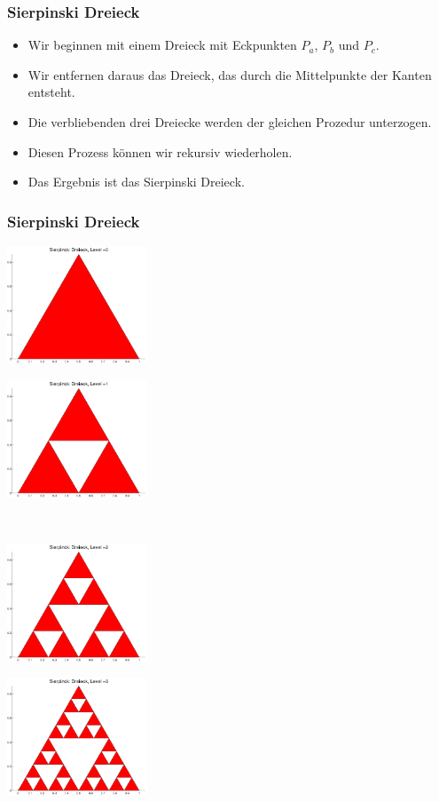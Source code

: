 %
% 
\begin{frame}[fragile]\frametitle{Sierpinski Dreieck}
\begin{itemize}
\item Wir beginnen mit einem Dreieck mit Eckpunkten $P_a$, $P_b$ und $P_c$. 
\item Wir entfernen daraus das Dreieck, das durch die Mittelpunkte der
  Kanten entsteht.
\item Die verbliebenden drei Dreiecke werden der gleichen Prozedur
  unterzogen.
\item Diesen Prozess können wir rekursiv wiederholen.
\item Das Ergebnis ist das Sierpinski Dreieck.
\end{itemize}
\end{frame}
%
% 
\begin{frame}[fragile]\frametitle{Sierpinski Dreieck}
\begin{minipage}{5cm}
\includegraphics[height=3.5cm]{./figures/sierpinski_0}
\end{minipage} \hfill
\begin{minipage}{5cm}
\includegraphics[height=3.5cm]{./figures/sierpinski_1}
\end{minipage}\\ 
\begin{minipage}{5cm}
\includegraphics[height=3.5cm]{./figures/sierpinski_2}
\end{minipage} \hfill
\begin{minipage}{5cm}
\includegraphics[height=3.5cm]{./figures/sierpinski_3}
\end{minipage} \\
\end{frame}
